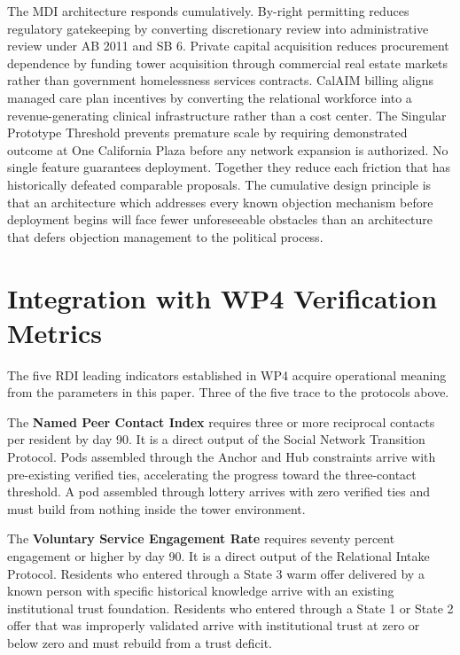 \documentclass[12pt, letterpaper]{article}
\begin{document}
The MDI architecture responds cumulatively. By-right permitting reduces regulatory gatekeeping by converting discretionary review into administrative review under AB 2011 and SB 6. Private capital acquisition reduces procurement dependence by funding tower acquisition through commercial real estate markets rather than government homelessness services contracts. CalAIM billing aligns managed care plan incentives by converting the relational workforce into a revenue-generating clinical infrastructure rather than a cost center. The Singular Prototype Threshold prevents premature scale by requiring demonstrated outcome at One California Plaza before any network expansion is authorized. No single feature guarantees deployment. Together they reduce each friction that has historically defeated comparable proposals. The cumulative design principle is that an architecture which addresses every known objection mechanism before deployment begins will face fewer unforeseeable obstacles than an architecture that defers objection management to the political process.


\clearpage
\section{Integration with WP4 Verification Metrics}

The five RDI leading indicators established in WP4 acquire operational meaning from the parameters in this paper. Three of the five trace to the protocols above.

The \textbf{Named Peer Contact Index} requires three or more reciprocal contacts per resident by day 90. It is a direct output of the Social Network Transition Protocol. Pods assembled through the Anchor and Hub constraints arrive with pre-existing verified ties, accelerating the progress toward the three-contact threshold. A pod assembled through lottery arrives with zero verified ties and must build from nothing inside the tower environment.

The \textbf{Voluntary Service Engagement Rate} requires seventy percent engagement or higher by day 90. It is a direct output of the Relational Intake Protocol. Residents who entered through a State 3 warm offer delivered by a known person with specific historical knowledge arrive with an existing institutional trust foundation. Residents who entered through a State 1 or State 2 offer that was improperly validated arrive with institutional trust at zero or below zero and must rebuild from a trust deficit.
\end{document}
